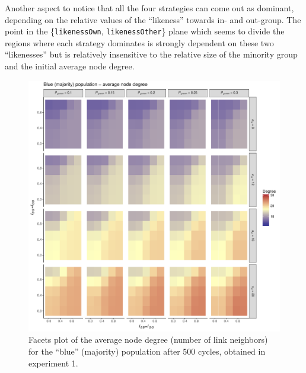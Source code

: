 Another aspect to notice that all the four strategies can come out as dominant, depending on the relative values of the ``likeness'' towards in- and out-group. The point in the \{\texttt{likenessOwn}, \texttt{likenessOther}\} plane which seems to divide the regions where each strategy dominates is strongly dependent on these two ``likenesses'' but is relatively insensitive to the relative size of the minority group and the initial average node degree.
\begin{figure}[ht!]
	\label{fig:avgBlueAgentDegreeExperiment1}
	\begin{minipage}[c]{0.2\linewidth}
		\caption{Facets plot of the average node degree (number of link neighbors) for the ``blue'' (majority) population after 500 cycles, obtained in experiment 1.}
	\end{minipage}
	\begin{minipage}[c]{0.75\linewidth}
		\includegraphics[trim={0cm 0cm 0.4cm 0cm}, clip, width=\linewidth]{figures/avgBlueAgentDegreeExperiment1.pdf}
	\end{minipage}
\end{figure}

